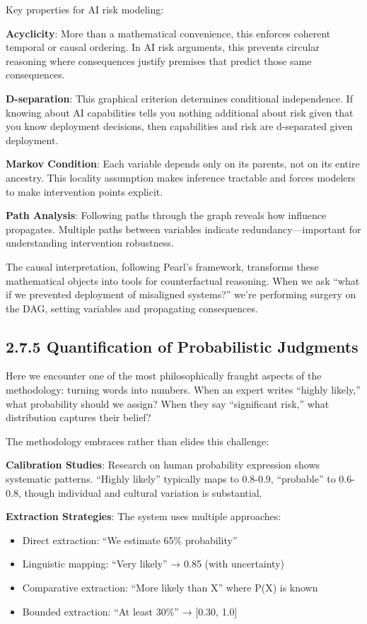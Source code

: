 \documentclass[
  11pt,
  letterpaper,
]{book}
\providecommand{\tightlist}{%
  \setlength{\itemsep}{0pt}\setlength{\parskip}{0pt}}
\begin{document}
Key properties for AI risk modeling:

\textbf{Acyclicity}: More than a mathematical convenience, this enforces
coherent temporal or causal ordering. In AI risk arguments, this
prevents circular reasoning where consequences justify premises that
predict those same consequences.

\textbf{D-separation}: This graphical criterion determines conditional
independence. If knowing about AI capabilities tells you nothing
additional about risk given that you know deployment decisions, then
capabilities and risk are d-separated given deployment.

\textbf{Markov Condition}: Each variable depends only on its parents,
not on its entire ancestry. This locality assumption makes inference
tractable and forces modelers to make intervention points explicit.

\textbf{Path Analysis}: Following paths through the graph reveals how
influence propagates. Multiple paths between variables indicate
redundancy---important for understanding intervention robustness.

The causal interpretation, following Pearl's framework, transforms these
mathematical objects into tools for counterfactual reasoning. When we
ask ``what if we prevented deployment of misaligned systems?'' we're
performing surgery on the DAG, setting variables and propagating
consequences.

\subsection{2.7.5 Quantification of Probabilistic
Judgments}\label{sec-quantification}

Here we encounter one of the most philosophically fraught aspects of the
methodology: turning words into numbers. When an expert writes ``highly
likely,'' what probability should we assign? When they say ``significant
risk,'' what distribution captures their belief?

The methodology embraces rather than elides this challenge:

\textbf{Calibration Studies}: Research on human probability expression
shows systematic patterns. ``Highly likely'' typically maps to 0.8-0.9,
``probable'' to 0.6-0.8, though individual and cultural variation is
substantial.

\textbf{Extraction Strategies}: The system uses multiple approaches:

\begin{itemize}
\tightlist
\item
  Direct extraction: ``We estimate 65\% probability''
\item
  Linguistic mapping: ``Very likely'' → 0.85 (with uncertainty)
\item
  Comparative extraction: ``More likely than X'' where P(X) is known
\item
  Bounded extraction: ``At least 30\%'' → {[}0.30, 1.0{]}
\end{itemize}
\end{document}
